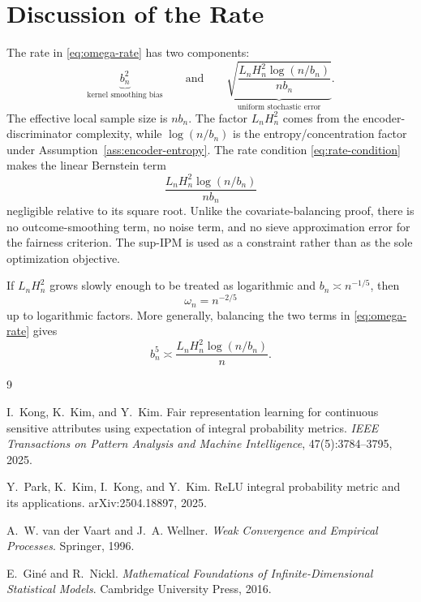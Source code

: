 \documentclass[11pt]{article}
\theoremstyle{remark}
\begin{document}
\section{Discussion of the Rate}

The rate in \eqref{eq:omega-rate} has two components:
\[
  \underbrace{b_n^2}_{\text{kernel smoothing bias}}
  \qquad\text{and}\qquad
  \underbrace{
  \sqrt{\frac{L_nH_n^2\log(n/b_n)}{nb_n}}
  }_{\text{uniform stochastic error}}.
\]
The effective local sample size is $nb_n$.  The factor $L_nH_n^2$ comes from the
encoder-discriminator complexity, while $\log(n/b_n)$ is the entropy/concentration
factor under Assumption~\ref{ass:encoder-entropy}.  The rate condition
\eqref{eq:rate-condition} makes the linear Bernstein term
\[
  \frac{L_nH_n^2\log(n/b_n)}{nb_n}
\]
negligible relative to its square root.  Unlike the covariate-balancing proof,
there is no outcome-smoothing term, no noise term, and no sieve approximation
error for the fairness criterion.  The sup-IPM is used as a constraint rather
than as the sole optimization objective.

If $L_nH_n^2$ grows slowly enough to be treated as logarithmic and
$b_n\asymp n^{-1/5}$, then
\[
  \omega_n=n^{-2/5}
\]
up to logarithmic factors.  More generally, balancing the two terms in
\eqref{eq:omega-rate} gives
\[
  b_n^5\asymp\frac{L_nH_n^2\log(n/b_n)}{n}.
\]

\begin{thebibliography}{9}

I.~Kong, K.~Kim, and Y.~Kim.
\newblock Fair representation learning for continuous sensitive attributes using expectation of integral probability metrics.
\newblock \emph{IEEE Transactions on Pattern Analysis and Machine Intelligence}, 47(5):3784--3795, 2025.

Y.~Park, K.~Kim, I.~Kong, and Y.~Kim.
\newblock ReLU integral probability metric and its applications.
\newblock arXiv:2504.18897, 2025.

A.~W. van der Vaart and J.~A. Wellner.
\newblock \emph{Weak Convergence and Empirical Processes}.
\newblock Springer, 1996.

E.~Gin\'e and R.~Nickl.
\newblock \emph{Mathematical Foundations of Infinite-Dimensional Statistical Models}.
\newblock Cambridge University Press, 2016.

\end{thebibliography}
\end{document}
